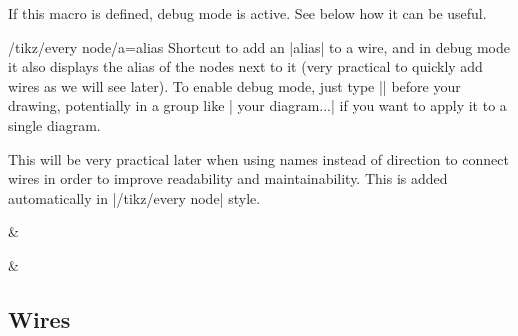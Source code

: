 \documentclass[a4paper]{ltxdoc}
\begin{document}
\begin{command}{\zxDebugMode{}}
  If this macro is defined, debug mode is active. See below how it can be useful.
\end{command}
\begin{stylekey}{/tikz/every node/a=alias}
  Shortcut to add an |alias| to a wire, and in debug mode it also displays the alias of the nodes next to it (very practical to quickly add wires as we will see later). To enable debug mode, just type |\def\zxDebugMode{}| before your drawing, potentially in a group like |{\def\zxDebugMode{} your diagram...}| if you want to apply it to a single diagram.

  This will be very practical later when using names instead of direction to connect wires in order to improve readability and maintainability. This is added automatically in |/tikz/every node| style.
\begin{codeexample}[width=3cm]
  \begin{ZX}
    \zxX[alias=A]{} & \zxZ[a=B]{\beta}
    \ar[from=A,to=B]
  \end{ZX}
  {\def\zxDebugMode{} %
    \begin{ZX}
      \zxX[a=A]{} & \zxZ[a=B]{\beta}
      \ar[from=A,to=B]
    \end{ZX}
  }
\end{codeexample}
\end{stylekey}


\subsection{Wires}
\end{document}
